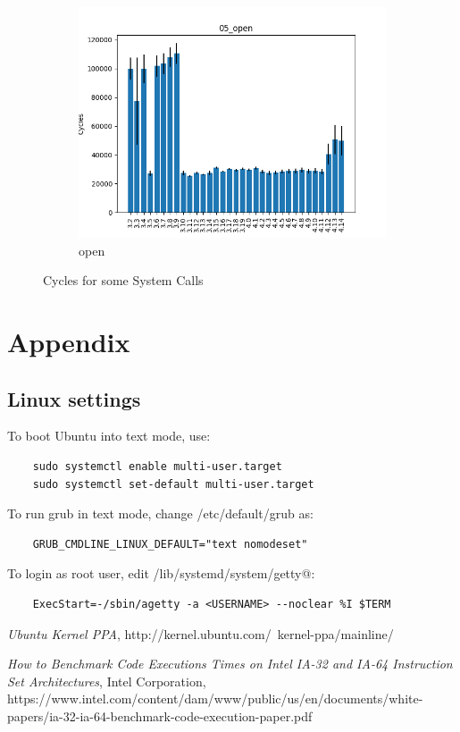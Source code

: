 \documentclass{article}
\begin{document}
\begin{figure}[h!]
\begin{subfigure}[b]{0.3\textwidth}
        \includegraphics[width=\textwidth]{../report/05_open.png}
        \caption{open}
    \end{subfigure}
    \caption{Cycles for some System Calls}
    \label{fig:cycles}
\end{figure}


\section{Appendix}

\subsection{Linux settings}

To boot Ubuntu into text mode, use:

\begin{verbatim}
    sudo systemctl enable multi-user.target
    sudo systemctl set-default multi-user.target
\end{verbatim}

To run grub in text mode, change /etc/default/grub as:

\begin{verbatim}
    GRUB_CMDLINE_LINUX_DEFAULT="text nomodeset"
\end{verbatim}

To login as root user, edit /lib/systemd/system/getty@:

\begin{verbatim}
    ExecStart=-/sbin/agetty -a <USERNAME> --noclear %I $TERM
\end{verbatim}


\begin{thebibliography}{9}
    \raggedright
    \emph{Ubuntu Kernel PPA},
    http://kernel.ubuntu.com/~kernel-ppa/mainline/

    \emph{How to Benchmark Code Executions Times on Intel IA-32 and IA-64 Instruction Set Architectures},
    Intel Corporation,
    https://www.intel.com/content/dam/www/public/us/en/documents/white-papers/ia-32-ia-64-benchmark-code-execution-paper.pdf
\end{thebibliography}
\end{document}
